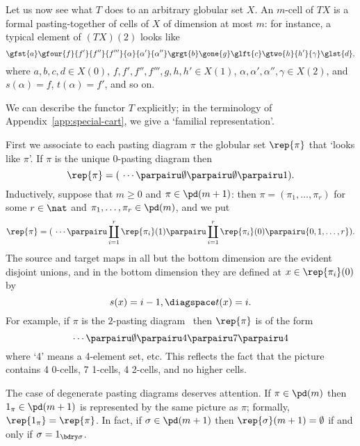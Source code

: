 Let us now see what $T$ does to an arbitrary globular set $X$.  An $m$-cell
of $TX$ is a formal pasting-together of cells of $X$ of dimension at most
$m$: for instance, a typical element of $(TX)(2)$ looks like%
%
%
% 
\begin{equation}	\label{eq:labelled-glob-pd}
\gfst{a}%
\gfour{f}{f'}{f''}{f'''}{\alpha}{\alpha'}{\alpha''}%
\grgt{b}%
\gone{g}%
\glft{c}%
\gtwo{h}{h'}{\gamma}%
\glst{d},
\end{equation}
% 
where $a,b,c,d \in X(0)$, $f,f',f'',f''',g,h,h' \in X(1)$,
$\alpha,\alpha',\alpha'',\gamma \in X(2)$, and $s(\alpha)=f$, $t(\alpha)=f'$,
and so on. 

We can describe the functor $T$ explicitly; in the terminology of
Appendix~\ref{app:special-cart}, we give a `familial%
%
%
representation'.  

First we associate to each pasting diagram $\pi$ the globular set
$\rep{\pi}$%
% 
%
%
%
% 
that `looks like $\pi$'.  If $\pi$ is the unique $0$-pasting
diagram then
\[
\rep{\pi} 
= 
(
\ 
\cdots
\parpairu
\emptyset 
\parpairu
\emptyset 
\parpairu 
1
).
\]
Inductively, suppose that $m\geq 0$ and $\pi\in\pd(m+1)$: then $\pi =
(\pi_1, \ldots, \pi_r)$ for some $r\in\nat$ and $\pi_1, \ldots, \pi_r \in
\pd(m)$, and we put 
%
\begin{equation}	\label{eqn:rep-constr}
\rep{\pi} = (\ \cdots \parpairu \coprod_{i=1}^{r} \rep{\pi_i}(1) 
		\parpairu \coprod_{i=1}^{r} \rep{\pi_i}(0)
		\parpairu \{0, 1, \ldots, r\} ).
\end{equation}
%
The source and target maps in all but the bottom dimension are the evident
disjoint unions, and in the bottom dimension they are defined at
$x\in\rep{\pi_i}(0)$ by 
\[
s(x) = i-1, \diagspace t(x) = i.
\]
For example, if $\pi$ is the $2$-pasting diagram~
then $\rep{\pi}$ is of the form
\[
\cdots 
\parpairu \emptyset 
\parpairu 4
\parpairu 7
\parpairu 4
\]
where `4' means a 4-element set, etc.  This reflects the fact that the
picture~\bref{eq:typical-glob-pd} contains 4 0-cells, 7 1-cells, 4 2-cells,
and no higher cells.

The case of degenerate%
%
%
pasting diagrams deserves attention.  If
$\pi\in\pd(m)$ then $1_\pi \in \pd(m+1)$ is represented by the same picture
as $\pi$; formally, $\rep{1_\pi} = \rep{\pi}$.%
%   
% 
In fact, if $\sigma \in \pd(m+1)$ then $\rep{\sigma}(m+1) = \emptyset$ if
and only if $\sigma = 1_{\bdry\sigma}$.

